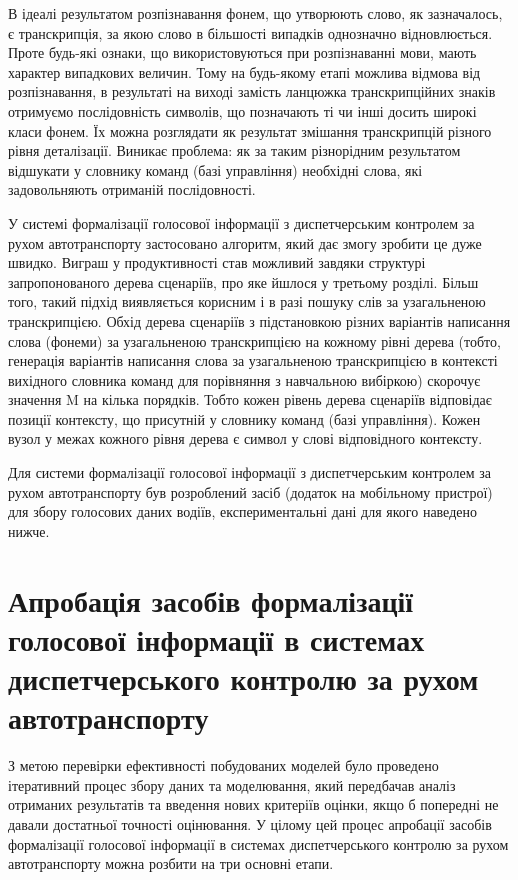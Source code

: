 В ідеалі результатом розпізнавання фонем, що утворюють слово, як зазначалось, є транскрипція, за якою слово в більшості випадків однозначно відновлюється. Проте будь-які ознаки, що використовуються при розпізнаванні мови, мають характер випадкових величин. Тому на будь-якому етапі можлива відмова від розпізнавання, в результаті на виході замість ланцюжка транскрипційних знаків отримуємо послідовність символів, що позначають ті чи інші досить широкі класи фонем. Їх можна розглядати як результат змішання транскрипцій різного рівня деталізації. Виникає проблема: як за таким різнорідним результатом відшукати у словнику команд (базі управління) необхідні слова, які задовольняють отриманій послідовності.

У системі формалізації голосової інформації з диспетчерським контролем за рухом автотранспорту застосовано алгоритм, який дає змогу зробити це дуже швидко. Виграш у продуктивності став можливий завдяки структурі запропонованого дерева сценаріїв, про яке йшлося у третьому розділі. Більш того, такий підхід виявляється корисним і в разі пошуку слів за узагальненою транскрипцією. Обхід дерева сценаріїв з підстановкою різних варіантів написання слова (фонеми) за узагальненою транскрипцією на кожному рівні дерева (тобто, генерація варіантів написання слова за узагальненою транскрипцією в контексті вихідного словника команд для порівняння з навчальною вибіркою) скорочує значення M на кілька порядків.
Тобто кожен рівень дерева сценаріїв відповідає позиції контексту, що присутній у словнику команд (базі управління). Кожен вузол у межах кожного рівня дерева є символ у слові відповідного контексту.

Для системи формалізації голосової інформації з диспетчерським контролем за рухом автотранспорту був розроблений засіб (додаток на мобільному пристрої) для збору голосових даних водіїв, експериментальні дані для якого наведено нижче.

\section{Апробація засобів формалізації голосової інформації в системах диспетчерського контролю за рухом автотранспорту} \label{sect4_2}

З метою перевірки ефективності побудованих моделей було проведено ітеративний процес збору даних та моделювання, який передбачав аналіз отриманих результатів та введення нових критеріїв оцінки, якщо б попередні не давали достатньої точності оцінювання. У цілому цей процес апробації засобів формалізації голосової інформації в системах диспетчерського контролю за рухом автотранспорту можна розбити на три основні етапи.


